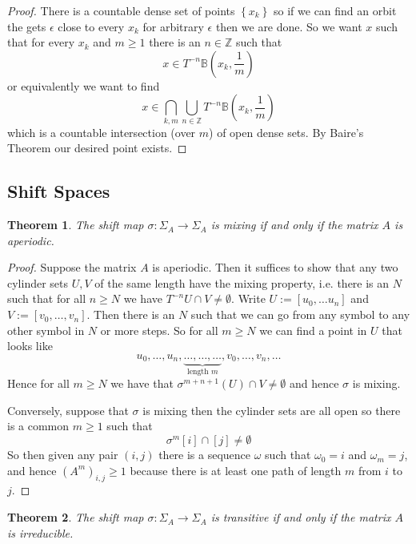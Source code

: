 \documentclass[11pt]{article}
\newcommand{\defeq}{:=}
\newcommand{\Z}{\mathbb{Z}}
\newtheorem{theorem}{Theorem}[section]
\begin{document}
\begin{proof}
There is a countable dense set of points $\left\{x_k\right\}$ so if we can find an orbit the gets $\epsilon$ close to every $x_k$ for arbitrary $\epsilon$ then we are done.
So we want $x$ such that for every $x_k$ and $m\geq 1$ there is an $n\in\Z$ such that
\[
	x\in T^{-n}\mathbb{B}\left(x_k,\frac{1}{m}\right)
\]
or equivalently we want to find
\[
	x\in\bigcap_{k, m}\bigcup_{n\in\Z}T^{-n}\mathbb{B}\left(x_k,\frac{1}{m}\right)
\]
which is a countable intersection (over $m$) of open dense sets.
By Baire's Theorem our desired point exists.
\end{proof}

\subsection{Shift Spaces}
\begin{theorem}
The shift map $\sigma: \Sigma_A \to \Sigma_A$ is mixing if and only if the matrix $A$ is aperiodic.
\end{theorem}

\begin{proof}
Suppose the matrix $A$ is aperiodic.
Then it suffices to show that any two cylinder sets $U, V$ of the same length have the mixing property, i.e. there is an $N$ such that for all $n\geq N$ we have $T^{-n}U\cap V\neq \emptyset$.
Write $U\defeq [u_0, \dots u_n]$ and $V\defeq [v_0, \dots, v_n]$.
Then there is an $N$ such that we can go from any symbol to any other symbol in $N$ or more steps.
So for all $m\geq N$ we can find a point in $U$ that looks like
\[
	u_0, \dots, u_n, \underbrace{\dots, \dots, \dots}_{\text{length }m}, v_0, \dots, v_n, \dots
\]
Hence for all $m\geq N$ we have that $\sigma^{m+n+1}(U)\cap V\neq\emptyset$ and hence $\sigma$ is mixing.

Conversely, suppose that $\sigma$ is mixing then the cylinder sets are all open so there is a common $m\geq 1$ such that
\[
	\sigma^m [i] \cap [j]\neq\emptyset
\]
So then given any pair $(i,j)$ there is a sequence $\omega$ such that $\omega_0=i$ and $\omega_m=j$, and hence $(A^m)_{i,j}\geq 1$ because there is at least one path of length $m$ from $i$ to $j$.
\end{proof}

\begin{theorem}
The shift map $\sigma: \Sigma_A \to \Sigma_A$ is transitive if and only if the matrix $A$ is irreducible.
\end{theorem}
\end{document}
